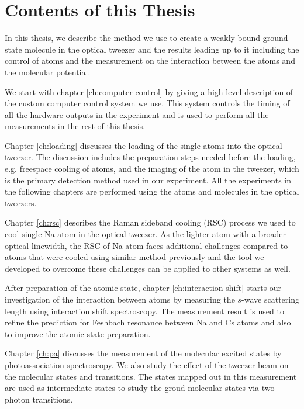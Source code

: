


\section{Contents of this Thesis}
\label{ch:introduction:contents}

In this thesis, we describe the method we use to create a weakly bound ground state molecule
in the optical tweezer and the results leading up to it including the control of atoms
and the measurement on the interaction between the atoms and the molecular potential.

We start with chapter \ref{ch:computer-control} by giving a high level description of
the custom computer control system we use.
This system controls the timing of all the hardware outputs in the experiment
and is used to perform all the measurements in the rest of this thesis.

Chapter \ref{ch:loading} discusses the loading of the single atoms into the optical tweezer.
The discussion includes the preparation steps needed before the loading,
e.g. freespace cooling of atoms,
and the imaging of the atom in the tweezer,
which is the primary detection method used in our experiment.
All the experiments in the following chapters are performed using
the atoms and molecules in the optical tweezers.

Chapter \ref{ch:rsc} describes the Raman sideband cooling (RSC) process
we used to cool single Na atom in the optical tweezer.
As the lighter atom with a broader optical linewidth,
the RSC of Na atom faces additional challenges compared to atoms
that were cooled using similar method previously
and the tool we developed to overcome these challenges can be applied to other systems as well.

After preparation of the atomic state,
chapter \ref{ch:interaction-shift} starts our investigation of the interaction between atoms
by measuring the $s$-wave scattering length using interaction shift spectroscopy.
The measurement result is used to refine the prediction for Feshbach resonance
between Na and Cs atoms and also to improve the atomic state preparation.

Chapter \ref{ch:pa} discusses the measurement of the molecular excited states
by photoassociation spectroscopy.
We also study the effect of the tweezer beam on the molecular states and transitions.
The states mapped out in this measurement are used as intermediate states
to study the groud molecular states via two-photon transitions.

